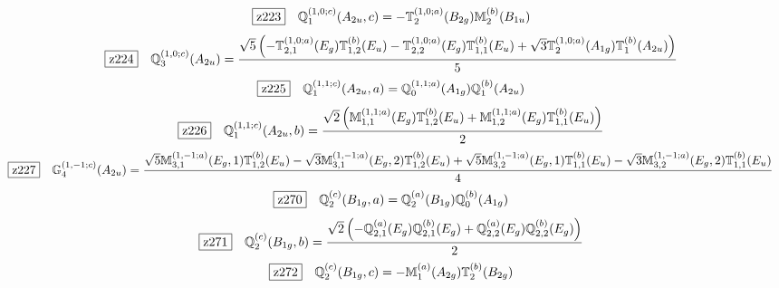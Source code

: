 \documentclass[fleqn,10pt,landscape]{jsarticle}
\begin{document}
\begin{dmath*}
\hspace*{3mm}\fbox{z223}\quad \mathbb{Q}_{1}^{(1,0;c)}(A_{2u},c)=- \mathbb{T}_{2}^{(1,0;a)}(B_{2g}) \mathbb{M}_{2}^{(b)}(B_{1u})
\end{dmath*}
\begin{dmath*}
\hspace*{3mm}\fbox{z224}\quad \mathbb{Q}_{3}^{(1,0;c)}(A_{2u})=\frac{\sqrt{5} \left(- \mathbb{T}_{2,1}^{(1,0;a)}(E_{g}) \mathbb{T}_{1,2}^{(b)}(E_{u}) - \mathbb{T}_{2,2}^{(1,0;a)}(E_{g}) \mathbb{T}_{1,1}^{(b)}(E_{u}) + \sqrt{3} \mathbb{T}_{2}^{(1,0;a)}(A_{1g}) \mathbb{T}_{1}^{(b)}(A_{2u})\right)}{5}
\end{dmath*}
\begin{dmath*}
\hspace*{3mm}\fbox{z225}\quad \mathbb{Q}_{1}^{(1,1;c)}(A_{2u},a)=\mathbb{Q}_{0}^{(1,1;a)}(A_{1g}) \mathbb{Q}_{1}^{(b)}(A_{2u})
\end{dmath*}
\begin{dmath*}
\hspace*{3mm}\fbox{z226}\quad \mathbb{Q}_{1}^{(1,1;c)}(A_{2u},b)=\frac{\sqrt{2} \left(\mathbb{M}_{1,1}^{(1,1;a)}(E_{g}) \mathbb{T}_{1,2}^{(b)}(E_{u}) + \mathbb{M}_{1,2}^{(1,1;a)}(E_{g}) \mathbb{T}_{1,1}^{(b)}(E_{u})\right)}{2}
\end{dmath*}
\begin{dmath*}
\hspace*{3mm}\fbox{z227}\quad \mathbb{G}_{4}^{(1,-1;c)}(A_{2u})=\frac{\sqrt{5} \mathbb{M}_{3,1}^{(1,-1;a)}(E_{g},1) \mathbb{T}_{1,2}^{(b)}(E_{u}) - \sqrt{3} \mathbb{M}_{3,1}^{(1,-1;a)}(E_{g},2) \mathbb{T}_{1,2}^{(b)}(E_{u}) + \sqrt{5} \mathbb{M}_{3,2}^{(1,-1;a)}(E_{g},1) \mathbb{T}_{1,1}^{(b)}(E_{u}) - \sqrt{3} \mathbb{M}_{3,2}^{(1,-1;a)}(E_{g},2) \mathbb{T}_{1,1}^{(b)}(E_{u})}{4}
\end{dmath*}
\begin{dmath*}
\hspace*{3mm}\fbox{z270}\quad \mathbb{Q}_{2}^{(c)}(B_{1g},a)=\mathbb{Q}_{2}^{(a)}(B_{1g}) \mathbb{Q}_{0}^{(b)}(A_{1g})
\end{dmath*}
\begin{dmath*}
\hspace*{3mm}\fbox{z271}\quad \mathbb{Q}_{2}^{(c)}(B_{1g},b)=\frac{\sqrt{2} \left(- \mathbb{Q}_{2,1}^{(a)}(E_{g}) \mathbb{Q}_{2,1}^{(b)}(E_{g}) + \mathbb{Q}_{2,2}^{(a)}(E_{g}) \mathbb{Q}_{2,2}^{(b)}(E_{g})\right)}{2}
\end{dmath*}
\begin{dmath*}
\hspace*{3mm}\fbox{z272}\quad \mathbb{Q}_{2}^{(c)}(B_{1g},c)=- \mathbb{M}_{1}^{(a)}(A_{2g}) \mathbb{T}_{2}^{(b)}(B_{2g})
\end{dmath*}
\end{document}
